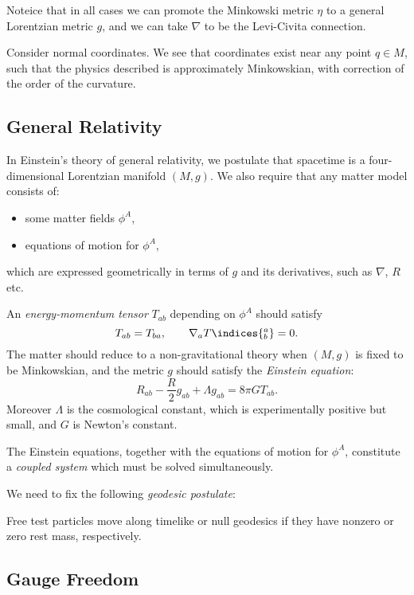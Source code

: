 \documentclass[12pt]{article}
\begin{document}
Noteice that in all cases we can promote the Minkowski metric $\eta$ to a general Lorentzian metric $g$, and we can take $\nabla$ to be the Levi-Civita connection.

Consider normal coordinates. We see that coordinates exist near any point $q \in M$, such that the physics described is approximately Minkowskian, with correction of the order of the curvature.

\subsection{General Relativity}%
\label{sub:gr}

In Einstein's theory of general relativity, we postulate that spacetime is a four-dimensional Lorentzian manifold $(M, g)$. We also require that any matter model consists of:
\begin{itemize}
	\item some matter fields $\phi^A$,
	\item equations of motion for $\phi^A$,
\end{itemize}
which are expressed geometrically in terms of $g$ and its derivatives, such as $\nabla$, $R$ etc.

An \emph{energy-momentum tensor} $T_{ab}$ depending on $\phi^A$ should satisfy
\[
T_{ab} = T_{ba}, \qquad \nabla_a T\indices{^{a}_{b}} = 0.
\]
The matter should reduce to a non-gravitational theory when $(M, g)$ is fixed to be Minkowskian, and the metric $g$ should satisfy the \emph{Einstein equation}:
\[
R_{ab} - \frac{R}{2} g_{ab} + \Lambda g_{ab} = 8 \pi G T_{ab}.
\]
Moreover $\Lambda$ is the cosmological constant, which is experimentally positive but small, and $G$ is Newton's constant.

The Einstein equations, together with the equations of motion for $\phi^A$, constitute a \emph{coupled system} which must be solved simultaneously.

We need to fix the following \emph{geodesic postulate}:
\begin{center}
	Free test particles move along timelike or null geodesics if they have nonzero or zero rest mass, respectively.
\end{center}

\subsection{Gauge Freedom}%
\label{sub:gf}
\end{document}
